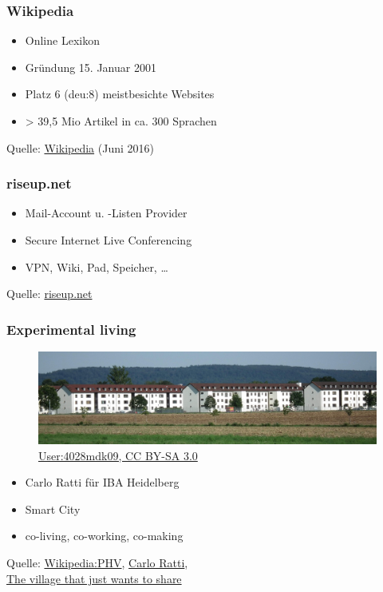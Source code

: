 \begin{frame}
	\frametitle{Wikipedia}

	\begin{itemize}
		\item Online Lexikon
		\item Gründung 15. Januar 2001
		\item Platz 6 (deu:8) meistbesichte Websites
		\item > 39,5 Mio Artikel in ca. 300 Sprachen
	\end{itemize}

	Quelle: \href{https://de.wikipedia.org/wiki/Wikipedia}{Wikipedia} (Juni 2016)
\end{frame}

\begin{frame}
	\frametitle{riseup.net}
	
	\begin{itemize}
		\item Mail-Account u. -Listen Provider
		\item Secure Internet Live Conferencing
		\item VPN, Wiki, Pad, Speicher, …
	\end{itemize}
	
	Quelle: \href{https://riseup.net/}{riseup.net}
\end{frame}

\begin{frame}
	\frametitle{Experimental living}
	
	\begin{figure}
		\includegraphics[height=0.2\textheight]{../../img/Wohnhaeuser_PHV_cut.jpg}
		\caption[Blick von Norden auf PHV, Ausschnitt]{\href{https://de.wikipedia.org/wiki/Datei:Wohnh\%C3\%A4user_PHV.JPG}{User:4028mdk09, CC BY-SA 3.0}}
	\end{figure}
	
	\begin{itemize}
		\item Carlo Ratti für IBA Heidelberg
		\item Smart City
		\item co-living, co-working, co-making
	\end{itemize}

	Quelle: \href{https://de.wikipedia.org/wiki/Patrick-Henry-Village}{Wikipedia:PHV}, \hspace{1cm}
	\href{http://www.carloratti.com/project/patrick-henry-commune/}{Carlo Ratti}, \\
	\href{http://www.bbc.co.uk/news/technology-37510322}{The village that just wants to share}
\end{frame}

